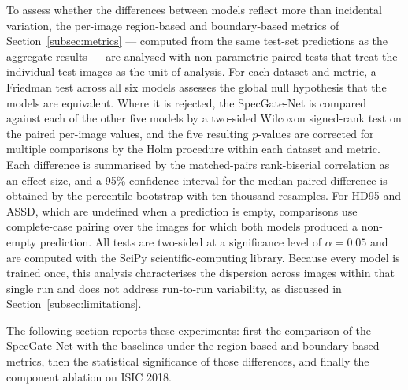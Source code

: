 To assess whether the differences between models reflect more than incidental variation, the per-image region-based and boundary-based metrics of Section~\ref{subsec:metrics} --- computed from the same test-set predictions as the aggregate results --- are analysed with non-parametric paired tests that treat the individual test images as the unit of analysis. For each dataset and metric, a Friedman test across all six models assesses the global null hypothesis that the models are equivalent. Where it is rejected, the SpecGate-Net is compared against each of the other five models by a two-sided Wilcoxon signed-rank test on the paired per-image values, and the five resulting $p$-values are corrected for multiple comparisons by the Holm procedure within each dataset and metric. Each difference is summarised by the matched-pairs rank-biserial correlation as an effect size, and a 95\% confidence interval for the median paired difference is obtained by the percentile bootstrap with ten thousand resamples. For HD95 and ASSD, which are undefined when a prediction is empty, comparisons use complete-case pairing over the images for which both models produced a non-empty prediction. All tests are two-sided at a significance level of $\alpha=0.05$ and are computed with the SciPy scientific-computing library. Because every model is trained once, this analysis characterises the dispersion across images within that single run and does not address run-to-run variability, as discussed in Section~\ref{subsec:limitations}.

The following section reports these experiments: first the comparison of the SpecGate-Net with the baselines under the region-based and boundary-based metrics, then the statistical significance of those differences, and finally the component ablation on ISIC 2018.

